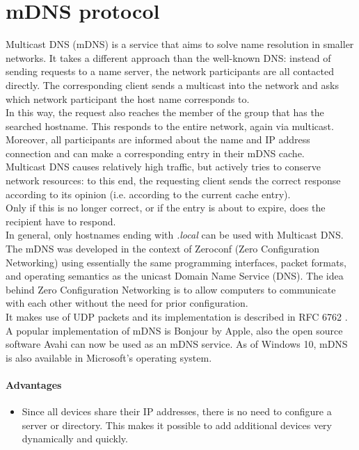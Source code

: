 \documentclass[fleqn, 10pt]{SelfArx} %
\begin{document}

\section{mDNS protocol}
Multicast DNS (mDNS) is a service that aims to solve name resolution in smaller networks. It takes a different approach than the well-known DNS: instead of sending requests to a name server, the network participants are all contacted directly.
The corresponding client sends a multicast into the network and asks which network participant the host name corresponds to. \\
In this way, the request also reaches the member of the group that has the searched hostname. This responds to the entire network, again via multicast. Moreover, all participants are informed about the name and IP address connection and can make a corresponding entry in their mDNS cache. \\
Multicast DNS causes relatively high traffic, but actively tries to conserve network resources: to this end, the requesting client sends the correct response according to its opinion (i.e. according to the current cache entry). \\ Only if this is no longer correct, or if the entry is about to expire, does the recipient have to respond. \\
In general, only hostnames ending with {\it{.local}} can be used with Multicast DNS.
The mDNS was developed in the context of Zeroconf (Zero Configuration Networking) using essentially the same programming interfaces, packet formats, and operating semantics as the unicast Domain Name Service (DNS). The idea behind Zero Configuration Networking is to allow computers to communicate with each other without the need for prior configuration.\\
It makes use of UDP packets and its implementation is described in RFC 6762 \cite{rfc6762}.\\
A popular implementation of mDNS is Bonjour by Apple, also the open source software Avahi can now be used as an mDNS service. As of Windows 10, mDNS is also available in Microsoft's operating system.

\paragraph{Advantages} 
\begin{itemize}[leftmargin=*]
    \item Since all devices share their IP addresses, there is no need to configure a server or directory. This makes it possible to add additional devices very dynamically and quickly.
\end{itemize}
\end{document}
